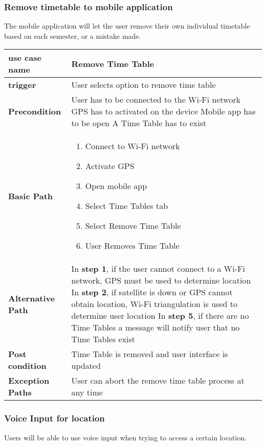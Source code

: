 \documentclass{article}
\begin{document}
\begin{center}
\subsubsection{Remove timetable to mobile application}
The mobile application will let the user remove their own individual timetable based on each semester, or a mistake made.
\newline
\begin{tabu} to 0.8\textwidth { | X[l] | X[c]| }
 \hline

\textbf{use case name} & Remove Time Table \\
 \hline
\textbf{trigger} & User selects option to remove time table    \\
 \hline
\textbf{Precondition} & User has to be connected to the Wi-Fi network
GPS has to activated on the device
Mobile app has to be open
A Time Table has to exist

    \\
\hline
\textbf{Basic Path} & 
\begin{enumerate}
  \item Connect to Wi-Fi network
  \item Activate GPS
  \item Open mobile app
  \item Select Time Tables tab
  \item Select Remove Time Table
  \item User Removes Time Table
\end{enumerate}  \\
\hline
\textbf{Alternative Path} & In\textbf{ step 1}, if the user cannot connect to a Wi-Fi network, GPS must be used to determine location
  \newline In \textbf{step 2}, if satellite is down or GPS cannot obtain location, Wi-Fi triangulation is used to determine user location
 \newline  In \textbf{step 5}, if there are no Time Tables a message will notify user that no Time Tables exist

 \\
\hline
\textbf{Post condition} & Time Table is removed and user interface is updated   \\
\hline
\textbf{Exception Paths} & User can abort the remove time table process at any time    \\
\hline
\end{tabu}
\newpage
\subsubsection{Voice Input for location}
Users will be able to use voice input when trying to access a certain location.
\begin{tabu} to 0.8\textwidth { | X[l] | X[c]| }
 \hline


\end{tabu}
\end{center}
\end{document}
